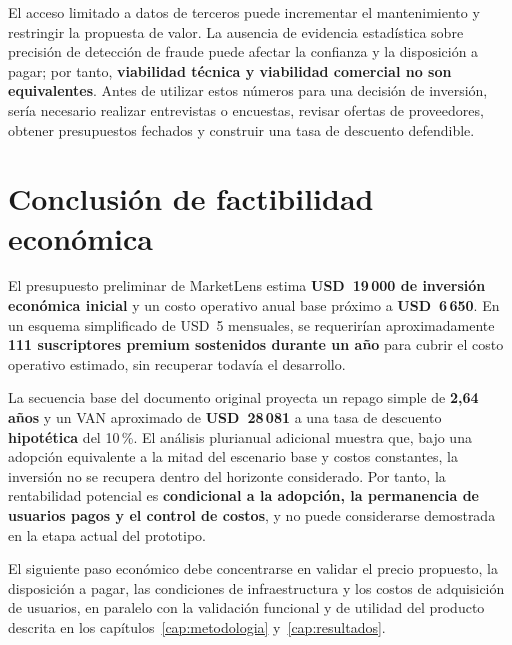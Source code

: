 El acceso limitado a datos de terceros puede incrementar el mantenimiento y restringir la propuesta de valor. La ausencia de evidencia estadística sobre precisión de detección de fraude puede afectar la confianza y la disposición a pagar; por tanto, \textbf{viabilidad técnica y viabilidad comercial no son equivalentes}. Antes de utilizar estos números para una decisión de inversión, sería necesario realizar entrevistas o encuestas, revisar ofertas de proveedores, obtener presupuestos fechados y construir una tasa de descuento defendible.

\section{Conclusión de factibilidad económica}\label{sec:ml-conclusion-economica}

El presupuesto preliminar de MarketLens estima \textbf{USD~19\,000 de inversión económica inicial} y un costo operativo anual base próximo a \textbf{USD~6\,650}. En un esquema simplificado de USD~5 mensuales, se requerirían aproximadamente \textbf{111 suscriptores premium sostenidos durante un año} para cubrir el costo operativo estimado, sin recuperar todavía el desarrollo.

La secuencia base del documento original proyecta un repago simple de \textbf{2,64 años} y un VAN aproximado de \textbf{USD~28\,081} a una tasa de descuento \textbf{hipotética} del 10\,\%. El análisis plurianual adicional muestra que, bajo una adopción equivalente a la mitad del escenario base y costos constantes, la inversión no se recupera dentro del horizonte considerado. Por tanto, la rentabilidad potencial es \textbf{condicional a la adopción, la permanencia de usuarios pagos y el control de costos}, y no puede considerarse demostrada en la etapa actual del prototipo.

El siguiente paso económico debe concentrarse en validar el precio propuesto, la disposición a pagar, las condiciones de infraestructura y los costos de adquisición de usuarios, en paralelo con la validación funcional y de utilidad del producto descrita en los capítulos~\ref{cap:metodologia} y~\ref{cap:resultados}.
